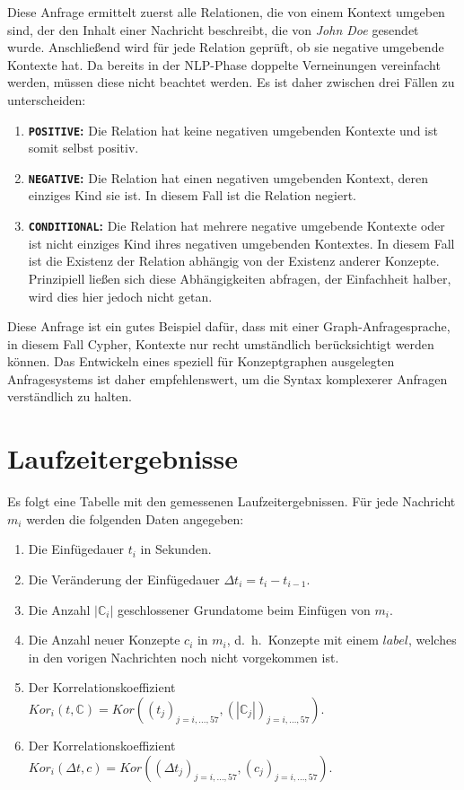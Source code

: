 \inputminted{cypher}{data/evaluation/personNegationAction.cql}
Diese Anfrage ermittelt zuerst alle Relationen, die von einem Kontext umgeben sind, der den Inhalt einer Nachricht beschreibt, die von \textit{John Doe} gesendet wurde.
Anschließend wird für jede Relation geprüft, ob sie negative umgebende Kontexte hat.
Da bereits in der NLP-Phase doppelte Verneinungen vereinfacht werden, müssen diese nicht beachtet werden.
Es ist daher zwischen drei Fällen zu unterscheiden:
\begin{enumerate}
	\item \textbf{\texttt{POSITIVE}:}
		Die Relation hat keine negativen umgebenden Kontexte und ist somit selbst positiv.
	\item \textbf{\texttt{NEGATIVE}:}
		Die Relation hat einen negativen umgebenden Kontext, deren einziges Kind sie ist.
		In diesem Fall ist die Relation negiert.
	\item \textbf{\texttt{CONDITIONAL}:}
		Die Relation hat mehrere negative umgebende Kontexte oder ist nicht einziges Kind ihres negativen umgebenden Kontextes.
		In diesem Fall ist die Existenz der Relation abhängig von der Existenz anderer Konzepte.
		Prinzipiell ließen sich diese Abhängigkeiten abfragen, der Einfachheit halber, wird dies hier jedoch nicht getan.
\end{enumerate}
Diese Anfrage ist ein gutes Beispiel dafür, dass mit einer Graph-Anfragesprache, in diesem Fall Cypher, Kontexte nur recht umständlich berücksichtigt werden können.
Das Entwickeln eines speziell für Konzeptgraphen ausgelegten Anfragesystems ist daher empfehlenswert, um die Syntax komplexerer Anfragen verständlich zu halten.

\section{Laufzeitergebnisse}%
\label{sec:appendix:perf}

Es folgt eine Tabelle mit den gemessenen Laufzeitergebnissen.
Für jede Nachricht $m_i$ werden die folgenden Daten angegeben:
\begin{enumerate}[noitemsep]
	\item Die Einfügedauer $t_i$ in Sekunden.
	\item Die Veränderung der Einfügedauer $\Delta t_i = t_i - t_{i - 1}$.
	\item Die Anzahl $|\mathbb{C}_i|$ geschlossener Grundatome beim Einfügen von $m_i$.
	\item Die Anzahl neuer Konzepte $c_i$ in $m_i$, d.~h.\ Konzepte mit einem $label$, welches in den vorigen Nachrichten noch nicht vorgekommen ist.
	\item Der Korrelationskoeffizient $Kor_i(t, \mathbb{C}) = Kor({(t_j)}_{j = i, \dots, 57}, {(|\mathbb{C}_j|)}_{j = i, \dots, 57})$.
	\item Der Korrelationskoeffizient $Kor_i(\Delta t, c) = Kor({(\Delta t_j)}_{j = i, \dots, 57}, {(c_j)}_{j = i, \dots, 57})$.
\end{enumerate}

